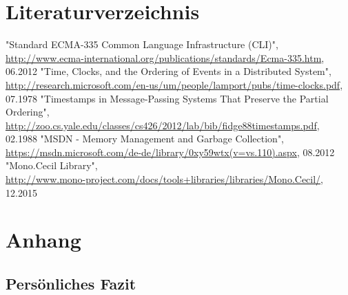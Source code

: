 \documentclass[10pt,a4paper]{article}
\begin{document}
\section*{Literaturverzeichnis}
\newcommand\oldsection{}
\let\oldsection=\section
\renewcommand{\section}[2]{}
\begin{thebibliography}{xxxxxxxxxxxxx}
"Standard ECMA-335 Common Language Infrastructure (CLI)", \href{http://www.ecma-international.org/publications/standards/Ecma-335.htm}{http://www.ecma-international.org/publications/standards/Ecma-335.htm}, 06.2012
"Time, Clocks, and the Ordering of Events in a Distributed System", \href{http://research.microsoft.com/en-us/um/people/lamport/pubs/time-clocks.pdf}{http://research.microsoft.com/en-us/um/people/lamport/pubs/time-clocks.pdf}, 07.1978
"Timestamps in Message-Passing Systems That Preserve the Partial Ordering", \href{http://zoo.cs.yale.edu/classes/cs426/2012/lab/bib/fidge88timestamps.pdf}{http://zoo.cs.yale.edu/classes/cs426/2012/lab/bib/fidge88timestamps.pdf}, 02.1988
"MSDN - Memory Management and Garbage Collection", \href{https://msdn.microsoft.com/de-de/library/0xy59wtx(v=vs.110).aspx}{https://msdn.microsoft.com/de-de/library/0xy59wtx(v=vs.110).aspx}, 08.2012
"Mono.Cecil Library",\\ \href{http://www.mono-project.com/docs/tools+libraries/libraries/Mono.Cecil/}{http://www.mono-project.com/docs/tools+libraries/libraries/Mono.Cecil/}, 12.2015
\end{thebibliography}
\let\section=\oldsection
\section*{Anhang}
\subsection*{Persönliches Fazit}
\end{document}
